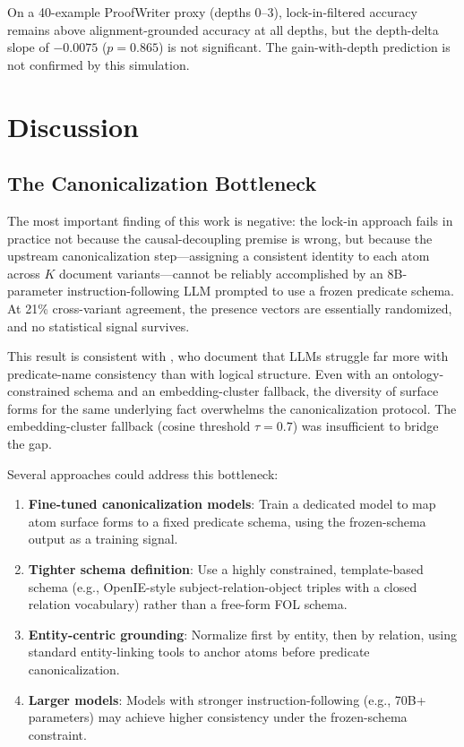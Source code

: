 \documentclass[11pt,letterpaper]{article}
\begin{document}
On a 40-example ProofWriter proxy (depths 0--3), lock-in-filtered accuracy remains above alignment-grounded accuracy
at all depths, but the depth-delta slope of $-0.0075$ ($p = 0.865$) is not significant. The gain-with-depth
prediction is not confirmed by this simulation.

\section{Discussion}

\subsection{The Canonicalization Bottleneck}

The most important finding of this work is negative: the lock-in approach fails in practice not because the
causal-decoupling premise is wrong, but because the upstream canonicalization step---assigning a consistent identity
to each atom across $K$ document variants---cannot be reliably accomplished by an 8B-parameter instruction-following
LLM prompted to use a frozen predicate schema. At 21\% cross-variant agreement, the presence vectors are essentially
randomized, and no statistical signal survives.

This result is consistent with \citet{Vossel2025}, who document that LLMs struggle far more with predicate-name
consistency than with logical structure. Even with an ontology-constrained schema and an embedding-cluster fallback,
the diversity of surface forms for the same underlying fact overwhelms the canonicalization protocol. The
embedding-cluster fallback (cosine threshold $\tau = 0.7$) was insufficient to bridge the gap.

Several approaches could address this bottleneck:

\begin{enumerate}
  \item \textbf{Fine-tuned canonicalization models}: Train a dedicated model to map atom surface forms to a fixed
    predicate schema, using the frozen-schema output as a training signal.
  \item \textbf{Tighter schema definition}: Use a highly constrained, template-based schema (e.g., OpenIE-style
    subject-relation-object triples with a closed relation vocabulary) rather than a free-form FOL schema.
  \item \textbf{Entity-centric grounding}: Normalize first by entity, then by relation, using standard entity-linking
    tools to anchor atoms before predicate canonicalization.
  \item \textbf{Larger models}: Models with stronger instruction-following (e.g., 70B+ parameters) may achieve higher
    consistency under the frozen-schema constraint.
\end{enumerate}
\end{document}
